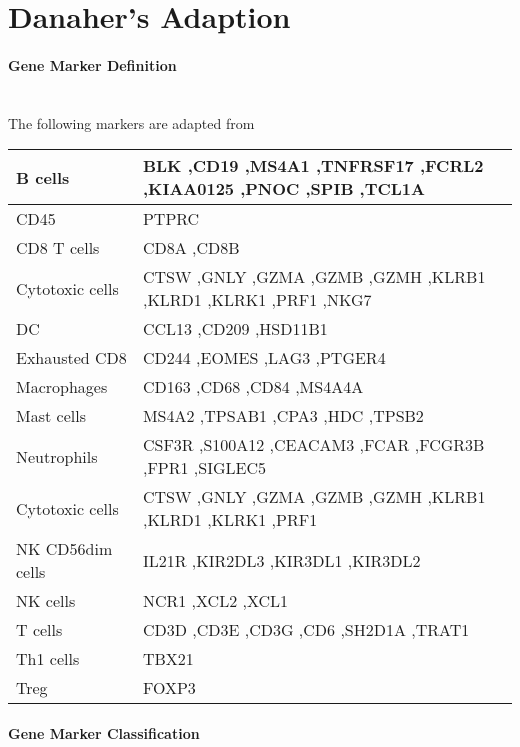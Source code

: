 \documentclass{article}
\begin{document}
\section{Danaher's Adaption}
\paragraph{Gene Marker Definition} ~\\
The following markers are adapted from  
\par
\begin{tabular}{ |l| p{10cm}| }
\hline
B cells&BLK ,CD19 ,MS4A1 ,TNFRSF17 ,FCRL2 ,KIAA0125 ,PNOC ,SPIB ,TCL1A \\ \hline
CD45&PTPRC \\ \hline
CD8 T cells&CD8A ,CD8B \\ \hline
Cytotoxic cells&CTSW ,GNLY ,GZMA ,GZMB ,GZMH ,KLRB1 ,KLRD1 ,KLRK1 ,PRF1 ,NKG7 \\ \hline
DC&CCL13 ,CD209 ,HSD11B1 \\ \hline 
Exhausted CD8&CD244 ,EOMES ,LAG3 ,PTGER4 \\\hline Macrophages&CD163 ,CD68 ,CD84 ,MS4A4A \\ \hline
Mast cells&MS4A2 ,TPSAB1 ,CPA3 ,HDC ,TPSB2 \\ \hline
Neutrophils&CSF3R ,S100A12 ,CEACAM3 ,FCAR ,FCGR3B ,FPR1 ,SIGLEC5 \\\hline
Cytotoxic cells&CTSW ,GNLY ,GZMA ,GZMB ,GZMH ,KLRB1 ,KLRD1 ,KLRK1 ,PRF1 \\\hline 
NK CD56dim cells&IL21R ,KIR2DL3 ,KIR3DL1 ,KIR3DL2 \\\hline
NK cells&NCR1 ,XCL2 ,XCL1 \\ \hline
T cells&CD3D ,CD3E ,CD3G ,CD6 ,SH2D1A ,TRAT1 \\ \hline
Th1 cells&TBX21 \\ \hline
Treg&FOXP3 \\
\hline
\end{tabular}
\paragraph{Gene Marker Classification}
\end{document}
